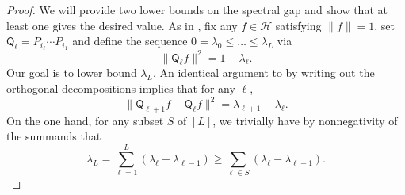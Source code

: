 \documentclass[10pt,a4paper]{amsart}
\begin{document}
\begin{proof}
    We will provide two lower bounds on the spectral gap and show that at least one gives the desired value. As in , fix any $f\in \mathcal{H}$ satisfying $\|f\|=1$, set $\mathsf{Q}_{\ell} = P_{i_{\ell}}\cdots P_{i_1}$ and define the sequence $0=\lambda_0\leq \ldots\leq \lambda_L$ via
\begin{equation*}
    \|\mathsf{Q}_{{\ell}}f\|^2 = 1-\lambda_{\ell}.
\end{equation*}
Our goal is to lower bound $\lambda_L$. An identical argument to  by writing out the orthogonal decompositions implies that for any $\ell$,
\begin{equation}
\label{eq:telescope_2}
    \|\mathsf{Q}_{{\ell+1}}f - \mathsf{Q}_{{\ell}}f\|^2 = \lambda_{\ell+1} - \lambda_{\ell}.
\end{equation}
On the one hand, for any subset $S$ of $[L]$, we trivially have by nonnegativity of the summands that
\begin{equation}
\label{eq:bound_1}
    \lambda_L = \sum_{\ell=1}^L (\lambda_{\ell}-\lambda_{\ell-1})\geq \sum_{\ell\in S} (\lambda_{\ell}-\lambda_{\ell-1}).
\end{equation}


\end{proof}
\end{document}
